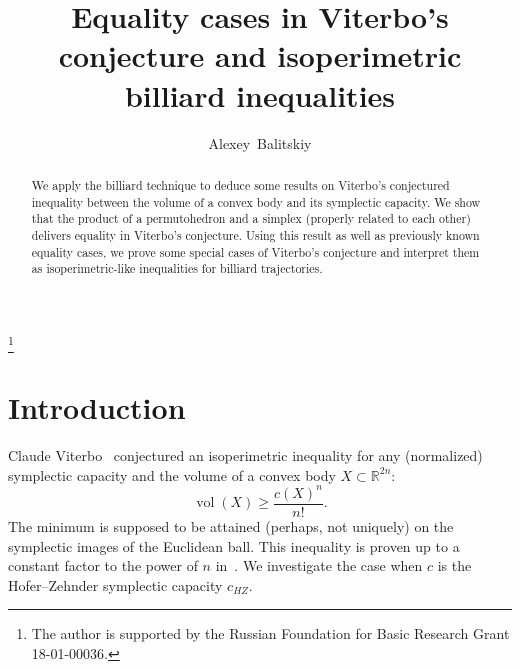 \documentclass[12pt,a4paper,oneside]{amsart}
\theoremstyle{definition}
\theoremstyle{remark}
\numberwithin{equation}{section}
\DeclareMathOperator{\volu}{vol}
\begin{document}
\title{Equality cases in Viterbo's conjecture and isoperimetric billiard inequalities}

\author[A.~Balitskiy]{Alexey~Balitskiy}

\thanks{The author is supported by the Russian Foundation for Basic Research Grant 18-01-00036.}

\address{Dept. of Mathematics, Massachusetts Institute of Technology, 182 Memorial Dr., Cambridge, MA 02142}
\address{Dept. of Mathematics, Moscow Institute of Physics and Technology, Institutskiy per. 9, Dolgoprudny, Russia 141700}
\address{Institute for Information Transmission Problems RAS, Bolshoy Karetny per. 19, Moscow, Russia 127994}


\begin{abstract}
We apply the billiard technique to deduce some results on Viterbo's conjectured inequality between the volume of a convex body and its symplectic capacity. We show that the product of a permutohedron and a simplex (properly related to each other) delivers equality in Viterbo's conjecture. Using this result as well as previously known equality cases, we prove some special cases of Viterbo's conjecture and interpret them as isoperimetric-like inequalities for billiard trajectories.
\end{abstract}

\maketitle

\section{Introduction}

Claude Viterbo~\cite{viterbo2000metric} conjectured an isoperimetric inequality for any (normalized) symplectic capacity and the volume of a convex body $X\subset \mathbb R^{2n}$:
\begin{equation}
\label{eq:viterbo}
\volu (X) \ge \frac{c(X)^n}{n!}.
\end{equation}
The minimum is supposed to be attained (perhaps, not uniquely) on the symplectic images of the Euclidean ball. This inequality is proven up to a constant factor to the power of $n$ in~\cite{artstein2008m}. We investigate the case when $c$ is the Hofer--Zehnder symplectic capacity $c_{HZ}$.
\end{document}
